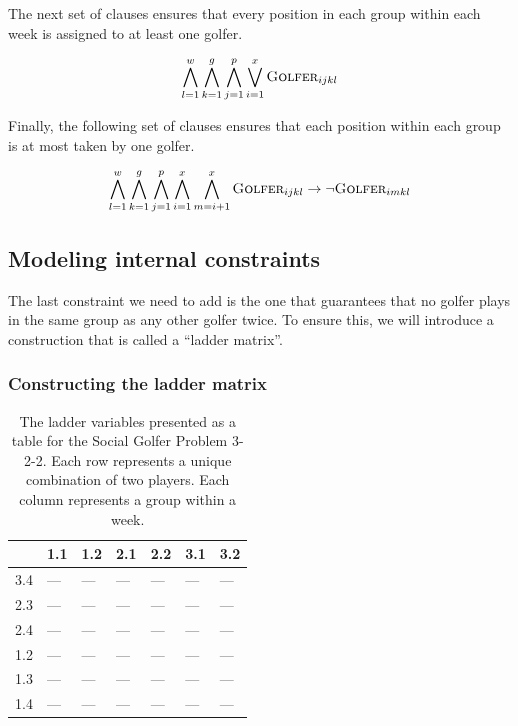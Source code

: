 \documentclass[a4paper]{scrartcl}
\begin{document}
The next set of clauses ensures that every position in each group within each week is assigned to at least one golfer.

\begin{equation}
\centering
    \bigwedge \limits_{l=1}^w 
    \bigwedge \limits_{k=1}^g 
    \bigwedge \limits_{j=1}^p
    \bigvee \limits_{i=1}^x 
    \textsc{Golfer}_{ijkl}
\end{equation}


Finally, the following set of clauses ensures that each position within each group is at most taken by one golfer.

\begin{equation}
\centering
    \bigwedge \limits_{l=1}^w 
    \bigwedge \limits_{k=1}^g 
    \bigwedge \limits_{j=1}^p
    \bigwedge \limits_{i=1}^x 
    \bigwedge \limits_{m=i+1}^x 
    \textsc{Golfer}_{ijkl} 
    \to
    \neg \textsc{Golfer}_{imkl}
\end{equation}


\subsection{Modeling internal constraints}

The last constraint we need to add is the one that guarantees that no golfer plays in the same group as any other golfer twice. To ensure this, we will introduce a construction that is called a ``ladder matrix''.


\subsubsection{Constructing the ladder matrix}

\begin{table}[h]
\centering
\label{ladder:example}
\begin{tabular}{ l | l | l | l | l | l | l }

    & 1.1 & 1.2 & 2.1 & 2.2 & 3.1 & 3.2 \\
\hline
3.4 & --- & --- & --- & --- & --- & --- \\
2.3 & --- & --- & --- & --- & --- & --- \\
2.4 & --- & --- & --- & --- & --- & --- \\
1.2 & --- & --- & --- & --- & --- & --- \\
1.3 & --- & --- & --- & --- & --- & --- \\
1.4 & --- & --- & --- & --- & --- & --- \\

\end{tabular}
\caption{The ladder variables presented as a table for the Social Golfer Problem 3-2-2. Each row represents a unique combination of two players. Each column represents a group within a week.}
\end{table}
\end{document}
